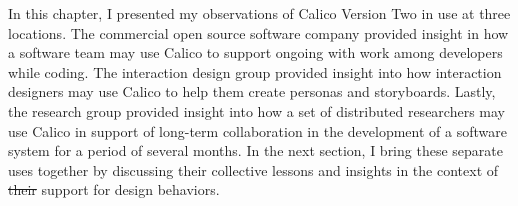 \documentclass[12pt,fleqn]{ucithesis}
\providecommand{\DIFaddtex}[1]{{\protect\color{blue}\uwave{#1}}} %
\providecommand{\DIFdeltex}[1]{{\protect\color{red}\sout{#1}}}                      %
\providecommand{\DIFaddbegin}{} %
\providecommand{\DIFaddend}{} %
\providecommand{\DIFdelbegin}{} %
\providecommand{\DIFdelend}{} %
\providecommand{\DIFadd}[1]{\texorpdfstring{\DIFaddtex{#1}}{#1}} %
\providecommand{\DIFdel}[1]{\texorpdfstring{\DIFdeltex{#1}}{}} %
\begin{document}
In this chapter, I presented my observations of Calico Version Two in use at three locations. The commercial open source software company provided insight in how a software team may use Calico to support ongoing with work among developers while coding. The interaction design group provided insight into how interaction designers may use Calico to help them create personas and storyboards. Lastly, the research group provided insight into how a set of distributed researchers may use Calico in support of long-term collaboration in the development of a software system for a period of several months. In the next section, I bring these separate uses together by discussing their collective lessons and insights in the context of \DIFdelbegin \DIFdel{their }\DIFdelend \DIFaddbegin \DIFadd{Calico's }\DIFaddend support for design behaviors.
\end{document}
